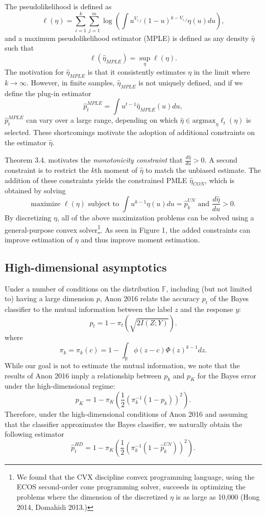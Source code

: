 \documentclass{article}
\newcommand{\argmax}{\text{argmax}}
\begin{document}
The pseudolikelihood is defined as
\begin{equation}\label{eq:psuedo}
\ell(\eta) = \sum_{i=1}^k \sum_{j=1}^{m} \log\left(\int u^{V_{i, j}} (1-u)^{k - V_{i, j}} \eta(u) du\right),
\end{equation}
and a maximum pseudolikelihood estimator (MPLE) is defined as any
density $\hat{\eta}$ such that
\[
\ell(\hat{\eta}_{MPLE}) = \sup_{\eta} \ell(\eta).
\]
The motivation for $\hat{\eta}_{MPLE}$ is that it consistently
estimates $\eta$ in the limit where $k \to \infty$.
However, in finite samples, $\hat{\eta}_{MPLE}$ is not uniquely defined,
and if we define the plug-in estimator
\[
\hat{p}_t^{MPLE} = \int u^{t-1} \hat{\eta}_{MPLE}(u) du,
\]
$\hat{p}_t^{MPLE}$ can vary over a large range, depending on which $\hat{\eta} \in \argmax_{\eta} \ell_t(\eta)$
is selected.
These shortcomings motivate the adoption of additional constraints on the estimator $\hat{\eta}$.

Theorem 3.4. motivates the \emph{monotonicity constraint} that $\frac{d\hat{\eta}}{du} > 0$.
A second constraint is to restrict the $k$th moment of $\hat{\eta}$ to match the unbiased estimate.
The addition of these constraints yields the constrained PMLE
$\hat{\eta}_{CON}$, which is obtained by solving
\[
\text{maximize }\ell(\eta) \text{ subject to }\int u^{k-1} \eta(u) du = \hat{p}_k^{UN}\text{ and }\frac{d\hat{\eta}}{du} > 0.
\]
By discretizing $\eta$, all of the above maximization problems can be solved using a general-purpose convex solver\footnote{
We found that the CVX discipline convex programming language, using the ECOS second-order cone programming solver,
succeeds in optimizing the problems where the dimension of the discretized $\eta$ is as large as 10,000 (Hong 2014, Domahidi 2013.)}.
As seen in Figure 1, the added constraints can improve estimation of $\eta$ and thus improve moment estimation.


\subsection{High-dimensional asymptotics}

Under a number of conditions on the distribution $\mathbb{F}$, including (but not limited to) having a large dimension $p$,
Anon 2016 relate the accuracy $p_t$ of the Bayes classifier to the mutual information between the label $z$ and
the response $y$:
\[
p_t = 1-\pi_t(\sqrt{2I(Z; Y)}).
\]
where
\[
\pi_k = \pi_k(c) = 1 - \int_{\mathbb{R}} \phi(z - c)  \Phi(z)^{k-1} dz.
\]
While our goal is not to estimate the mutual information, we note that the results of Anon 2016
imply a relationship between $p_k$ and $p_K$ for the Bayes error under the high-dimensional regime:
\[
p_K = 1-\pi_K\left(\frac{1}{2}(\pi_k^{-1}(1-p_k))^2\right).
\]
Therefore, under the high-dimensional conditions of Anon 2016 and assuming that the classifier approximates
the Bayes classifier, we naturally obtain the following estimator
\[
\hat{p}_t^{HD} = 1-\pi_K\left(\frac{1}{2}(\pi_k^{-1}(1-\hat{p}_k^{UN}))^2\right).
\]
\end{document}
